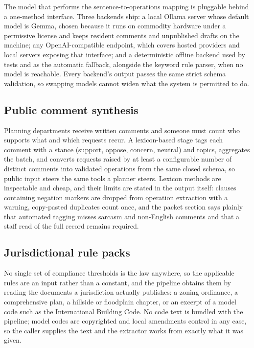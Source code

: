 \documentclass[11pt]{article}
\begin{document}
The model that performs the sentence-to-operations mapping is
pluggable behind a one-method interface. Three backends ship: a local
Ollama server whose default model is Gemma, chosen because it runs on
commodity hardware under a permissive license and keeps resident
comments and unpublished drafts on the machine; any OpenAI-compatible
endpoint, which covers hosted providers and local servers exposing
that interface; and a deterministic offline backend used by tests and
as the automatic fallback, alongside the keyword rule parser, when no
model is reachable. Every backend's output passes the same strict
schema validation, so swapping models cannot widen what the system is
permitted to do.

\subsection{Public comment synthesis}
Planning departments receive written comments and someone must count
who supports what and which requests recur. A lexicon-based stage tags
each comment with a stance (support, oppose, concern, neutral) and
topics, aggregates the batch, and converts requests raised by at least
a configurable number of distinct comments into validated operations
from the same closed schema, so public input steers the same tools a
planner steers. Lexicon methods are inspectable and cheap, and their
limits are stated in the output itself: clauses containing negation
markers are dropped from operation extraction with a warning,
copy-pasted duplicates count once, and the packet section says
plainly that automated tagging misses sarcasm and non-English comments
and that a staff read of the full record remains required.

\subsection{Jurisdictional rule packs}
\label{sec:packs}
No single set of compliance thresholds is the law anywhere, so the
applicable rules are an input rather than a constant, and the pipeline
obtains them by reading the documents a jurisdiction actually
publishes: a zoning ordinance, a comprehensive plan, a hillside or
floodplain chapter, or an excerpt of a model code such as the
International Building Code. No code text is bundled with the
pipeline; model codes are copyrighted and local amendments control in
any case, so the caller supplies the text and the extractor works from
exactly what it was given.
\end{document}
